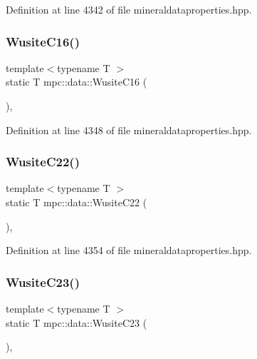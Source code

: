 Definition at line 4342 of file mineraldataproperties.\+hpp.

\mbox{\label{namespacempc_1_1data_a87f4de9ce302d78dc4ea804452323010}} 
\subsubsection{\texorpdfstring{Wusite\+C16()}{WusiteC16()}}
{\footnotesize\ttfamily template$<$typename T $>$ \\
static T mpc\+::data\+::\+Wusite\+C16 (\begin{DoxyParamCaption}{ }\end{DoxyParamCaption})\hspace{0.3cm}{\ttfamily [inline]}, {\ttfamily [static]}}



Definition at line 4348 of file mineraldataproperties.\+hpp.

\mbox{\label{namespacempc_1_1data_ad52e88ae03b4503f0cf51baab30b0fb6}} 
\subsubsection{\texorpdfstring{Wusite\+C22()}{WusiteC22()}}
{\footnotesize\ttfamily template$<$typename T $>$ \\
static T mpc\+::data\+::\+Wusite\+C22 (\begin{DoxyParamCaption}{ }\end{DoxyParamCaption})\hspace{0.3cm}{\ttfamily [inline]}, {\ttfamily [static]}}



Definition at line 4354 of file mineraldataproperties.\+hpp.

\mbox{\label{namespacempc_1_1data_ad72934051064d47b386d6600a78cc145}} 
\subsubsection{\texorpdfstring{Wusite\+C23()}{WusiteC23()}}
{\footnotesize\ttfamily template$<$typename T $>$ \\
static T mpc\+::data\+::\+Wusite\+C23 (\begin{DoxyParamCaption}{ }\end{DoxyParamCaption})\hspace{0.3cm}{\ttfamily [inline]}, {\ttfamily [static]}}



